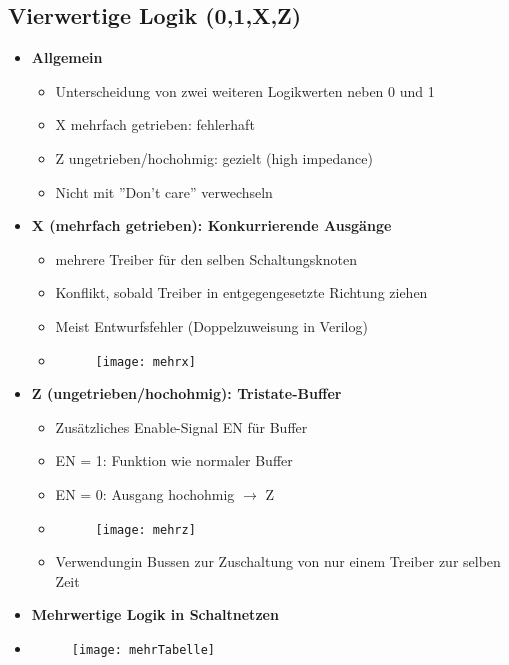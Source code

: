 \subsection{Vierwertige Logik (0,1,X,Z)}
\begin{itemize}

\item \textbf{Allgemein}
	\begin{itemize}
	\item Unterscheidung von zwei weiteren Logikwerten neben 0 und 1
	\item X mehrfach getrieben: fehlerhaft
	\item Z ungetrieben/hochohmig: gezielt (high impedance)
	\item Nicht mit ''Don't care'' verwechseln
	\end{itemize}

\item \textbf{X (mehrfach getrieben): Konkurrierende Ausgänge}
	\begin{itemize}
	\item mehrere Treiber für den selben Schaltungsknoten
	\item Konflikt, sobald Treiber in entgegengesetzte Richtung ziehen
	\item Meist Entwurfsfehler (Doppelzuweisung in Verilog)
	\item[] \begin{figure}[H]
				\begin{center}
				\texttt{[image: mehrx]}
				\end{center}
			\end{figure}
	\end{itemize}
	
\item \textbf{Z (ungetrieben/hochohmig): Tristate-Buffer}
	\begin{itemize}
	\item Zusätzliches Enable-Signal EN für Buffer
	\item EN = 1: Funktion wie normaler Buffer
	\item EN = 0: Ausgang hochohmig $\rightarrow$ Z
	\item[] \begin{figure}[H]
				\begin{center}
				\texttt{[image: mehrz]}
				\end{center}
			\end{figure}
	\item Verwendungin Bussen zur Zuschaltung von nur einem Treiber zur selben Zeit
	\end{itemize}
	
\item \textbf{Mehrwertige Logik in Schaltnetzen}
\item[] \begin{figure}[H]
				\begin{center}
				\texttt{[image: mehrTabelle]}
				\end{center}
			\end{figure}


\end{itemize}

